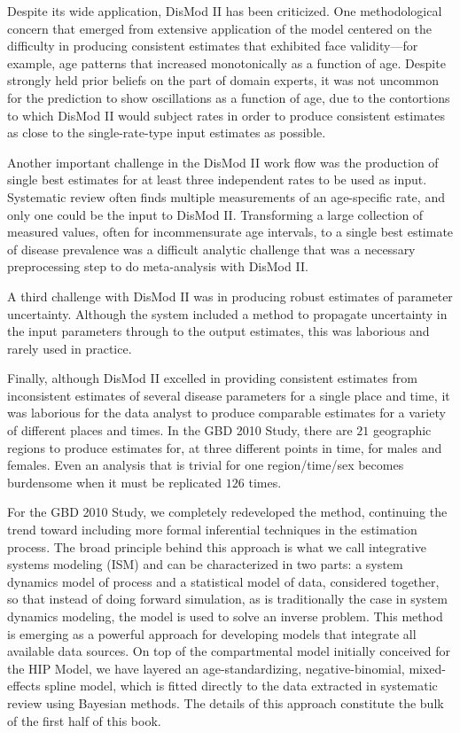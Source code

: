 Despite its wide application, DisMod II has been
criticized.  One methodological concern that emerged from extensive
application of the model centered on the difficulty in producing
consistent estimates that exhibited face validity---for example, age
patterns that increased monotonically as a function of age. Despite
strongly held prior beliefs on the part of domain experts, it was not
uncommon for the prediction to show oscillations as a function of age, due
to the contortions to which DisMod II would subject rates in order to
produce consistent estimates as close to the single-rate-type input
estimates as possible.

Another important challenge in the DisMod II work flow was the
production of single best estimates for at least three independent
rates to be used as input.  Systematic review often finds multiple
measurements of an age-specific rate, and only one could be the input to
DisMod II.  Transforming a large collection of measured values, often
for incommensurate age intervals, to a single best estimate of disease
prevalence was a difficult analytic challenge that was a necessary
preprocessing step to do meta-analysis with DisMod II.

A third challenge with DisMod II was in producing robust estimates of
parameter uncertainty.  Although the system included a method to
propagate uncertainty in the input parameters through to the output
estimates, this was laborious and rarely used in practice.

Finally, although DisMod II excelled in providing consistent estimates
from inconsistent estimates of several disease
parameters for a single place and time, it was laborious
for the data analyst to produce comparable estimates for a variety of
different places and times. In the GBD 2010
Study, there are $21$ geographic regions to produce estimates for, at
three different points in time, for males and females. Even an
analysis that is trivial for one region/time/sex becomes burdensome
when it must be replicated $126$ times.

For the GBD 2010 Study, we completely redeveloped the
method, continuing the trend toward including more formal inferential
techniques in the estimation process.  The broad principle behind
this approach is what we call integrative systems modeling (ISM) and
can be characterized in two parts: a system dynamics model of process
and a statistical model of data, considered together, so that instead
of doing forward simulation, as is traditionally the case in system
dynamics modeling, the model is used to solve an inverse problem. This
method is emerging as a powerful approach for developing models that
integrate all available data sources.  On top
of the compartmental model initially conceived for the HIP Model, we
have layered an age-standardizing, negative-binomial, mixed-effects
spline model, which is fitted directly to the data extracted in
systematic review using Bayesian methods.  The details of this
approach constitute the bulk of the first half of this book.

